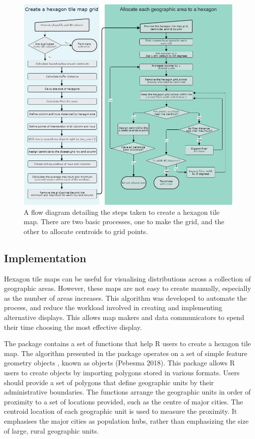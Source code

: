 \begin{figure}
\includegraphics[width=1\linewidth]{figs/sugarbag_flow} \caption{A flow diagram detailing the steps taken to create a hexagon tile map. There are two basic processes, one to make the grid, and the other to allocate centroids to grid points.}\label{fig:sugarbagflow}
\end{figure}

\hypertarget{implementation}{%
\subsection{Implementation}\label{implementation}}

Hexagon tile maps can be useful for visualising distributions across a collection of geographic areas. However, these maps are not easy to create manually, especially as the number of areas increases. This algorithm was developed to automate the process, and reduce the workload involved in creating and implementing alternative displays. This allows map makers and data communicators to spend their time choosing the most effective display.

The  package contains a set of functions that help R users to create a hexagon tile map. The algorithm presented in the  package operates on a set of simple feature geometry objects , known as  objects (Pebesma 2018). This package allows R users to create  objects by importing polygons stored in various formats. Users should provide a set of polygons that define geographic units by their administrative boundaries. The functions arrange the geographic units in order of proximity to a set of locations provided, such as the centre of major cities. The centroid location of each geographic unit is used to measure the proximity. It emphasises the major cities as population hubs, rather than emphasizing the size of large, rural geographic units.

